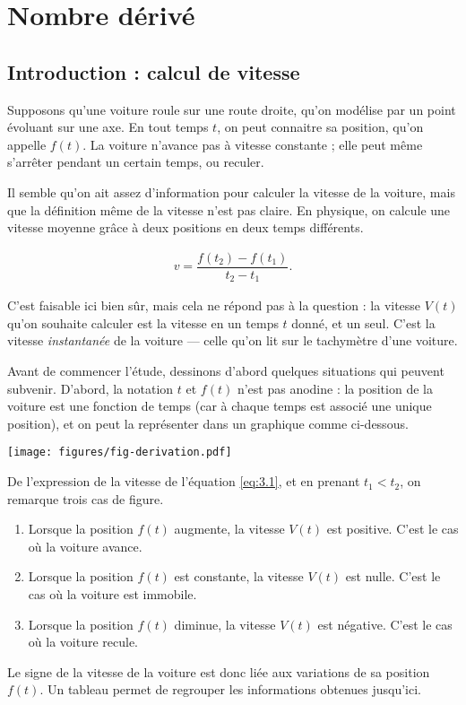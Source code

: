 
\chapter{Nombre dérivé}

\section{Introduction : calcul de vitesse}

Supposons qu'une voiture roule sur une route droite, qu'on modélise par un point évoluant sur une axe.
En tout temps $t$, on peut connaitre sa position, qu'on appelle $f(t)$.
La voiture n'avance pas à vitesse constante ;
elle peut même s'arrêter pendant un certain temps, ou reculer.


Il semble qu'on ait assez d'information pour calculer la vitesse de la voiture, mais que la définition même de la vitesse n'est pas claire.
En physique, on calcule une vitesse moyenne grâce à deux positions en deux temps différents.

	\begin{align}
		v = \dfrac{f(t_2) - f(t_1)}{t_2-t_1}. \label{eq:3.1}
	\end{align}

C'est faisable ici bien sûr, mais cela ne répond pas à la question : la vitesse $V(t)$ qu'on souhaite calculer est la vitesse en un temps $t$ donné, et un seul.
C'est la vitesse \emph{instantanée} de la voiture --- celle qu'on lit sur le tachymètre d'une voiture.


Avant de commencer l'étude, dessinons d'abord quelques situations qui peuvent subvenir.
D'abord, la notation $t$ et $f(t)$ n'est pas anodine : la position de la voiture est une fonction de temps (car à chaque temps est associé une unique position), et on peut la représenter dans un graphique comme ci-dessous.

\texttt{[image: figures/fig-derivation.pdf]}

De l'expression de la vitesse de l'équation \eqref{eq:3.1}, et en prenant $t_1 < t_2$, on remarque trois cas de figure.
\begin{enumerate}
	\item Lorsque la position $f(t)$ augmente, la vitesse $V(t)$ est positive. 
	C'est le cas où la voiture avance.
	\item Lorsque la position $f(t)$ est constante, la vitesse $V(t)$ est nulle.
	C'est le cas où la voiture est immobile. 
	\item Lorsque la position $f(t)$ diminue, la vitesse $V(t)$ est négative.
	C'est le cas où la voiture recule.
\end{enumerate}
Le signe de la vitesse de la voiture est donc liée aux variations de sa position $f(t)$.
Un tableau permet de regrouper les informations obtenues jusqu'ici.
	
